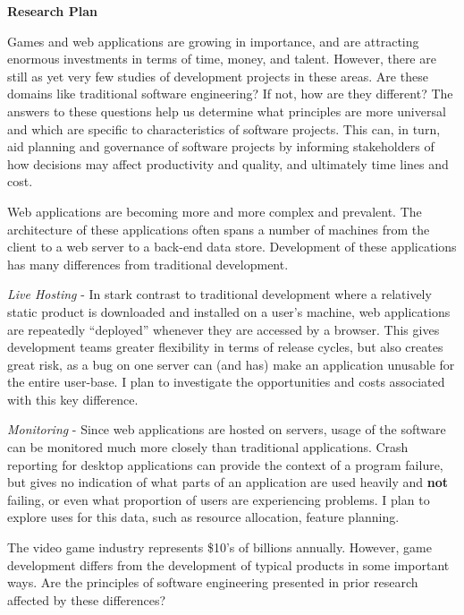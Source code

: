 \documentclass[9pt]{article}
\newenvironment{packed_enum}{%
\vspace{-4pt}
\begin{enumerate}
  \setlength{\itemsep}{1pt}
  \setlength{\parskip}{0pt}
  \setlength{\parsep}{0pt}
}{\end{enumerate}
\vspace{-4pt}%
}
\newcommand\Section[1]{\vspace{6pt}\noindent\textbf{#1}\vspace{4pt}}
\begin{document}
\begin{small}
\Section{Research Plan}

Games and web applications are growing in importance, and are attracting
enormous investments in terms of time, money, and talent. However, there are
still as yet very few studies of development projects in these areas. Are these
domains like traditional software engineering? If not, how are they different?
The answers to these questions help us determine what principles are more
universal and which are specific to characteristics of software projects.  This
can, in turn, aid planning and governance of software projects by informing
stakeholders of how decisions may affect productivity and quality, and ultimately
time lines and cost.

Web applications are becoming more and more complex and prevalent.  The
architecture of these applications often spans a number of machines from the
client to a web server to a back-end data store.  Development of these
applications has many differences from traditional development.

\begin{packed_enum}

\item \emph{Live Hosting} - 
%
    In stark contrast to traditional development where a relatively static
    product is downloaded and installed on a user's machine, web applications
    are repeatedly ``deployed'' whenever they are accessed by a browser.  This
    gives development teams greater flexibility in terms of release cycles, 
    but also creates great risk, as a bug on one server can
    (and has) make an application unusable for the entire user-base.  I plan to
    investigate the opportunities and costs associated with this key
    difference.

\item \emph{Monitoring} - 
%
    Since web applications are hosted on servers, usage of the software can be
    monitored much more closely than traditional applications.  Crash reporting
    for desktop applications can provide the context of a program failure, but
    gives no indication of what parts of an application are used heavily and
    \textbf{not} failing, or even what proportion of users are experiencing
    problems.  I plan to explore uses for this data, such as resource allocation,
    feature planning.
    
\end{packed_enum}

The video game industry represents \$10's of billions annually. However, game
development differs from the development of typical products in some important
ways.  Are the principles of software engineering presented in prior research
affected by these differences?


\end{small}
\end{document}
